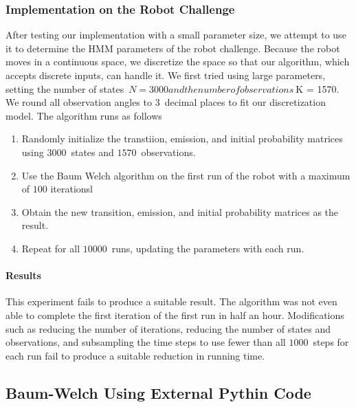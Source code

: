\documentclass[twoside]{article}
\begin{document}

\subsubsection{Implementation on the Robot Challenge}\label{sec:impl-robot-challenge}

After testing our implementation with a small parameter size, we attempt to use it to determine the HMM parameters of the robot challenge.
Because the robot moves in a continuous space, we discretize the space so that our algorithm, which accepts discrete inputs, can handle it.
We first tried using large parameters, setting the number of states~${N = \num{3000}} and the number of observations~${K = \num{1570}}.
We round all observation angles to $3$~decimal places to fit our discretization model.
The algorithm runs as follows
\begin{enumerate}
  \item Randomly initialize the transtiion, emission, and initial probability matrices using $\num{3000}$~states and $\num{1570}$~observations.
  \item Use the Baum Welch algorithm on the first run of the robot with a maximum of $\num{100}$ iterationsl
  \item Obtain the new transition, emission, and initial probability matrices as the result.
  \item Repeat for all $\num{10000}$~runs, updating the parameters with each run.
\end{enumerate}

\paragraph{Results}

This experiment fails to produce a suitable result.
The algorithm was not even able to complete the first iteration of the first run in half an hour.
Modifications such as reducing the number of iterations, reducing the number of states and observations, and subsampling the time steps to use fewer than all $\num{1000}$~steps for each run fail to produce a suitable reduction in running time.

\subsection{Baum-Welch Using External Pythin Code}
\label{sec:bw-python-libs}

\end{document}
